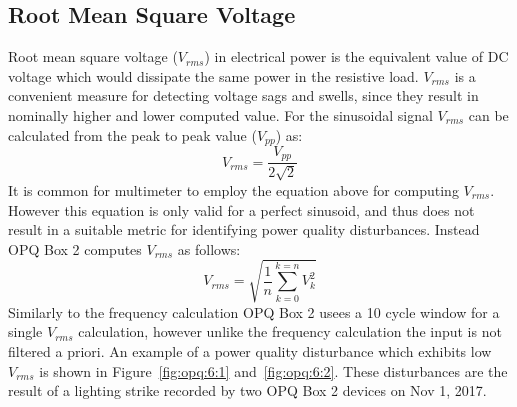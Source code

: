 \subsection{Root Mean Square Voltage}\label{subsec:root-mean-square-voltage}

Root mean square voltage ($V_{rms}$) in electrical power is the equivalent value of DC voltage which would dissipate the same power in the resistive load. $V_{rms}$ is a convenient measure for detecting voltage sags and swells, since they result in nominally higher and lower computed value.
For the sinusoidal signal $V_{rms}$ can be calculated from the peak to peak value ($V_{pp}$) as:
\begin{equation} \label{eq:2}
	V_{rms} = \frac{V_{pp}}{2\sqrt{2}}
\end{equation}
It is common for multimeter to employ the equation above for computing $V_{rms}$.
However this equation is only valid for a perfect sinusoid, and thus does not result in a suitable metric for identifying power quality disturbances.
Instead OPQ Box 2 computes $V_{rms}$ as follows:
\begin{equation} \label{eq:3}
	V_{rms} = \sqrt{\frac{1}{n}\sum\limits_{k=0}^{k=n}V_{k}^{2}}
\end{equation}
Similarly to the frequency calculation OPQ Box 2 usees a 10 cycle window for a single $V_{rms}$ calculation, however unlike the frequency calculation the input is not filtered a priori.
An example of a power quality disturbance which exhibits low $V_{rms}$ is shown in Figure~\ref{fig:opq:6:1} and~\ref{fig:opq:6:2}.
These disturbances are the result of a lighting strike recorded by two OPQ Box 2 devices on Nov 1, 2017.


